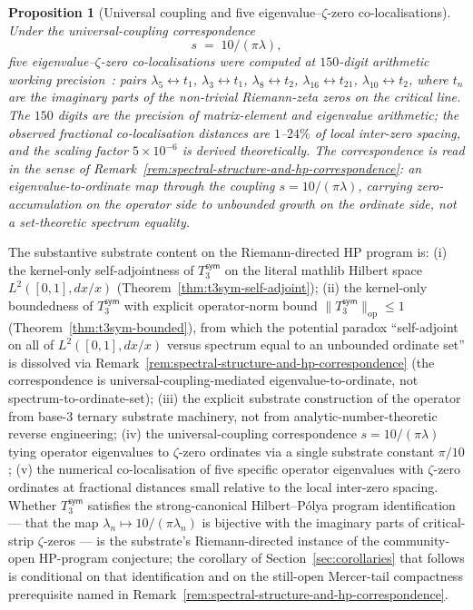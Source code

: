 \documentclass[11pt,a4paper]{amsart}
\theoremstyle{plain}
\newtheorem{proposition}[theorem]{Proposition}
\theoremstyle{definition}
\newcommand{\Tsym}{T_3^{\textsf{sym}}}
\begin{document}
\begin{proposition}[Universal coupling and five eigenvalue--$\zeta$-zero co-localisations]\label{prop:universal-coupling}
Under the universal-coupling correspondence
\[
s \;=\; 10/(\pi \lambda),
\]
five eigenvalue--$\zeta$-zero co-localisations were computed at $150$-digit arithmetic \emph{working} precision~\cite{cohen2025transferOp}: pairs $\lambda_{5} \leftrightarrow t_{1}$, $\lambda_{3} \leftrightarrow t_{1}$, $\lambda_{8} \leftrightarrow t_{2}$, $\lambda_{16} \leftrightarrow t_{21}$, $\lambda_{10} \leftrightarrow t_{2}$, where $t_{n}$ are the imaginary parts of the non-trivial Riemann-zeta zeros on the critical line. The $150$ digits are the precision of matrix-element and eigenvalue arithmetic; the observed fractional co-localisation distances are $1$--$24\%$ of local inter-zero spacing, and the scaling factor $5 \times 10^{-6}$ is derived theoretically. The correspondence is read in the sense of Remark~\ref{rem:spectral-structure-and-hp-correspondence}: an eigenvalue-to-ordinate map through the coupling $s = 10/(\pi\lambda)$, carrying zero-accumulation on the operator side to unbounded growth on the ordinate side, not a set-theoretic spectrum equality.
\end{proposition}

The substantive substrate content on the Riemann-directed HP program is: (i) the kernel-only self-adjointness of $\Tsym$ on the literal mathlib Hilbert space $L^{2}([0,1], dx/x)$ (Theorem~\ref{thm:t3sym-self-adjoint}); (ii) the kernel-only boundedness of $\Tsym$ with explicit operator-norm bound $\|\Tsym\|_{\mathrm{op}} \le 1$ (Theorem~\ref{thm:t3sym-bounded}), from which the potential paradox ``self-adjoint on all of $L^{2}([0,1], dx/x)$ versus spectrum equal to an unbounded ordinate set'' is dissolved via Remark~\ref{rem:spectral-structure-and-hp-correspondence} (the correspondence is universal-coupling-mediated eigenvalue-to-ordinate, not spectrum-to-ordinate-set); (iii) the explicit substrate construction of the operator from base-3 ternary substrate machinery, not from analytic-number-theoretic reverse engineering; (iv) the universal-coupling correspondence $s = 10/(\pi \lambda)$ tying operator eigenvalues to $\zeta$-zero ordinates via a single substrate constant $\pi/10$; (v) the numerical co-localisation of five specific operator eigenvalues with $\zeta$-zero ordinates at fractional distances small relative to the local inter-zero spacing. Whether $\Tsym$ satisfies the strong-canonical Hilbert--P\'olya program identification --- that the map $\lambda_{n} \mapsto 10/(\pi \lambda_{n})$ is bijective with the imaginary parts of critical-strip $\zeta$-zeros --- is the substrate's Riemann-directed instance of the community-open HP-program conjecture; the corollary of Section~\ref{sec:corollaries} that follows is conditional on that identification and on the still-open Mercer-tail compactness prerequisite named in Remark~\ref{rem:spectral-structure-and-hp-correspondence}.
\end{document}
